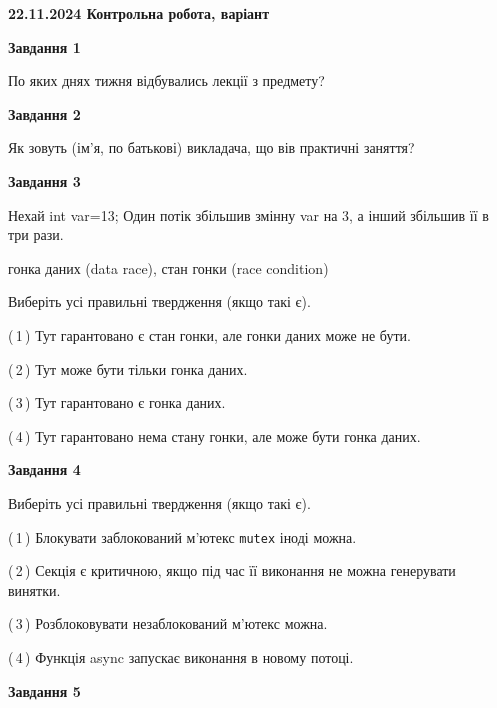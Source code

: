 \documentclass[12pt, ukrainian]{article}
\def\code#1{\Verb!#1!}
\begin{document}
\begin {large}

\textbf{22.11.2024 Контрольна робота, варіант  }\par


{

\begin{center}
\textbf{Завдання 1}
\end{center}

По яких днях тижня відбувались лекції з предмету?


\begin{center}
\textbf{Завдання 2}
\end{center}

Як зовуть (ім'я, по батькові) викладача, що вів практичні заняття?


\begin{center}
\textbf{Завдання 3}
\end{center}

Нехай int var=13; Один потік збільшив змінну var на 3, а інший збільшив її в три рази.

гонка даних (data race), стан гонки (race condition)

Виберіть усі правильні твердження (якщо такі є).\par
\vspace{2mm}
(\,1\,) Тут гарантовано є стан гонки, але гонки даних може не бути.%

(\,2\,) Тут може бути тільки гонка даних.%

(\,3\,) Тут гарантовано є гонка даних.%

(\,4\,) Тут гарантовано нема стану гонки, але може бути гонка даних.%


\begin{center}
\textbf{Завдання 4}
\end{center}

Виберіть усі правильні твердження (якщо такі є).\par
\vspace{2mm}

(\,1\,) Блокувати заблокований м’ютекс  \code{mutex} іноді можна.%

(\,2\,) Секція є критичною, якщо під час її виконання не можна генерувати винятки.%

(\,3\,) Розблоковувати незаблокований м’ютекс можна.%

(\,4\,) Функція async запускає виконання в новому потоці.%


\begin{center}
\textbf{Завдання 5}
\end{center}

}
\end{large}
\end{document}
